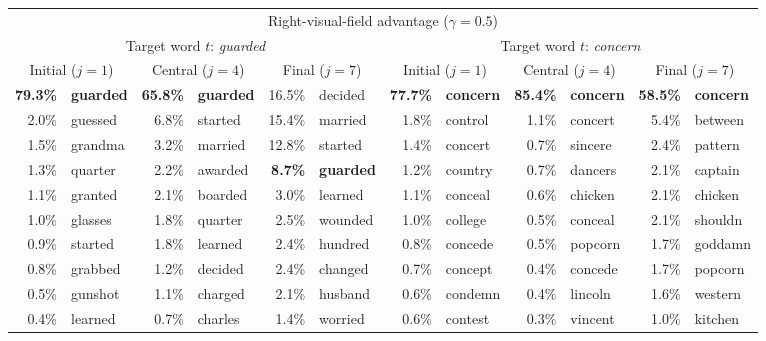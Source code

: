\documentclass[doc,biblatex]{apa7}
\begin{document}
\begin{table}
\begin{adjustwidth}{-0.68in}{-0.68in}
\begin{center}
\begin{threeparttable}
\begin{tabular}{rlrlrlrlrlrl}
\midrule
\multicolumn{12}{c}{Right-visual-field advantage ($\gamma = 0.5$)} \\
\multicolumn{6}{c}{Target word $t$: \textit{guarded}} & \multicolumn{6}{c}{Target word $t$: \textit{concern}} \\
\multicolumn{2}{c}{Initial ($j=1$)} & \multicolumn{2}{c}{Central ($j=4$)} & \multicolumn{2}{c}{Final ($j=7$)} & \multicolumn{2}{c}{Initial ($j=1$)} & \multicolumn{2}{c}{Central ($j=4$)} & \multicolumn{2}{c}{Final ($j=7$)} \\
\textbf{79.3\%}     & \textbf{guarded} & \textbf{65.8\%}  & \textbf{guarded} & 16.5\% & decided & \textbf{77.7\%}  & \textbf{concern} & \textbf{85.4\%}  & \textbf{concern} & \textbf{58.5\%} & \textbf{concern} \\
2.0\%      & guessed & 6.8\%   & started & 15.4\% & married & 1.8\%   & control & 1.1\%   & concert & 5.4\%  & between \\
1.5\%      & grandma & 3.2\%   & married & 12.8\% & started & 1.4\%   & concert & 0.7\%   & sincere & 2.4\%  & pattern \\
1.3\%      & quarter & 2.2\%   & awarded & \textbf{8.7\%}  & \textbf{guarded} & 1.2\%   & country & 0.7\%   & dancers & 2.1\%  & captain \\
1.1\%      & granted & 2.1\%   & boarded & 3.0\%  & learned & 1.1\%   & conceal & 0.6\%   & chicken & 2.1\%  & chicken \\
1.0\%      & glasses & 1.8\%   & quarter & 2.5\%  & wounded & 1.0\%   & college & 0.5\%   & conceal & 2.1\%  & shouldn \\
0.9\%      & started & 1.8\%   & learned & 2.4\%  & hundred & 0.8\%   & concede & 0.5\%   & popcorn & 1.7\%  & goddamn \\
0.8\%      & grabbed & 1.2\%   & decided & 2.4\%  & changed & 0.7\%   & concept & 0.4\%   & concede & 1.7\%  & popcorn \\
0.5\%      & gunshot & 1.1\%   & charged & 2.1\%  & husband & 0.6\%   & condemn & 0.4\%   & lincoln & 1.6\%  & western \\
0.4\%      & learned & 0.7\%   & charles & 1.4\%  & worried & 0.6\%   & contest & 0.3\%   & vincent & 1.0\%  & kitchen \\
\bottomrule
\end{tabular}
\end{threeparttable}
\end{center}
\end{adjustwidth}
\end{table}
\end{document}
